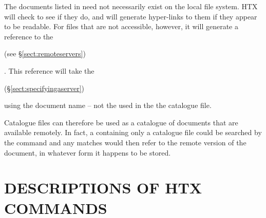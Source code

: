 The documents listed in   need not necessarily exist on the local
file system. HTX will check to see if they do, and will generate
hyper-links to them if they appear to be readable. For files that are
not accessible, however, it will generate a reference to the
\begin{latexonly}
(see \S\ref{sect:remoteservers})
\end{latexonly}. This reference will
take the \begin{latexonly}
(\S\ref{sect:specifyingaserver})
\end{latexonly}
using the document name -- not the  used in the the catalogue file.

Catalogue files can therefore be used as a
 catalogue of
documents that are available remotely. In fact, a  containing only a catalogue file
could be searched by the  command and any
matches would then refer to the remote version of the document, in
whatever form it happens to be stored.

\newpage
\appendix
\section{\label{sect:commanddescriptions}DESCRIPTIONS OF HTX COMMANDS}






